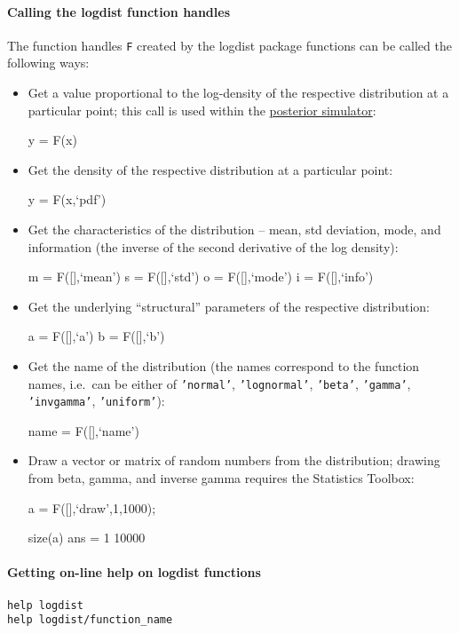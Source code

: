 \paragraph{Calling the logdist function
handles}\label{calling-the-logdist-function-handles}

The function handles \texttt{F} created by the logdist package functions
can be called the following ways:

\begin{itemize}
\item
  Get a value proportional to the log-density of the respective
  distribution at a particular point; this call is used within the
  \href{poster/Contents}{posterior simulator}:

  y = F(x)
\item
  Get the density of the respective distribution at a particular point:

  y = F(x,`pdf')
\item
  Get the characteristics of the distribution -- mean, std deviation,
  mode, and information (the inverse of the second derivative of the log
  density):

  m = F({[}{]},`mean') s = F({[}{]},`std') o = F({[}{]},`mode') i =
  F({[}{]},`info')
\item
  Get the underlying ``structural'' parameters of the respective
  distribution:

  a = F({[}{]},`a') b = F({[}{]},`b')
\item
  Get the name of the distribution (the names correspond to the function
  names, i.e.~can be either of \texttt{'normal'}, \texttt{'lognormal'},
  \texttt{'beta'}, \texttt{'gamma'}, \texttt{'invgamma'},
  \texttt{'uniform'}):

  name = F({[}{]},`name')
\item
  Draw a vector or matrix of random numbers from the distribution;
  drawing from beta, gamma, and inverse gamma requires the Statistics
  Toolbox:

  a = F({[}{]},`draw',1,1000);

  size(a) ans = 1 10000
\end{itemize}

\paragraph{Getting on-line help on logdist
functions}\label{getting-on-line-help-on-logdist-functions}

\begin{verbatim}
help logdist
help logdist/function_name
\end{verbatim}



